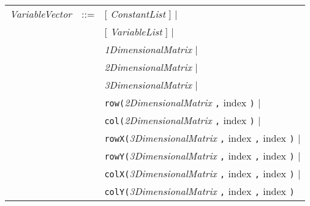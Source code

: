 \documentclass{article}
\newcommand{\Comment}[1]{}
\begin{document}
\begin{small}
\begin{tabular}{rcl}
\textit{VariableVector}  & ::= & [ \textit{ConstantList} ] $\mid$\\
                         &     & [ \textit{VariableList}  ] $\mid$ \\
                         &     & \textit{1DimensionalMatrix} $\mid$\\
                         &     & \textit{2DimensionalMatrix} $\mid$\\
                         &     & \textit{3DimensionalMatrix} $\mid$\\
                         &     & \texttt{row(}\textit{2DimensionalMatrix} \texttt{,} index \texttt{)} $\mid$\\
                         &     & \texttt{col(}\textit{2DimensionalMatrix} \texttt{,} index \texttt{)} $\mid$\\
                         &     & \texttt{rowX(}\textit{3DimensionalMatrix} \texttt{,} index \texttt{,} index \texttt{)} $\mid$\\
                         &     & \texttt{rowY(}\textit{3DimensionalMatrix} \texttt{,} index \texttt{,} index \texttt{)} $\mid$\\
                         &     & \texttt{colX(}\textit{3DimensionalMatrix} \texttt{,} index \texttt{,} index \texttt{)} $\mid$\\
                         &     & \texttt{colY(}\textit{3DimensionalMatrix} \texttt{,} index \texttt{,} index \texttt{)} \\




\end{tabular}













\Comment{


}
\end{small}
\end{document}
